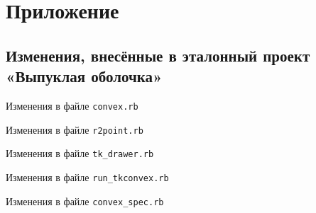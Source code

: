 \section{Приложение}
\subsection{Изменения, внесённые в эталонный проект «Выпуклая оболочка»}
Изменения в файле \verb|convex.rb|
\begin{tiny}

\end{tiny}

Изменения в файле \verb|r2point.rb|
\begin{tiny}

\end{tiny}

Изменения в файле \verb|tk_drawer.rb|
\begin{tiny}

\end{tiny}

Изменения в файле \verb|run_tkconvex.rb|
\begin{tiny}

\end{tiny}

Изменения в файле \verb|convex_spec.rb|
\begin{tiny}

\end{tiny}
